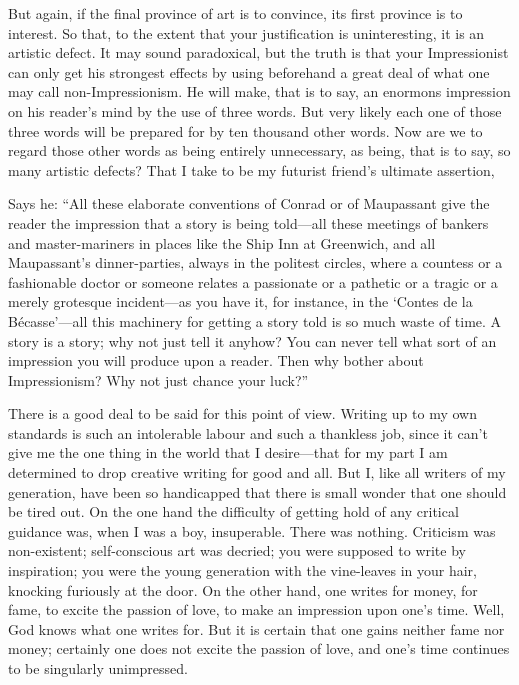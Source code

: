 But again, if the final province of art is to convince, its first
province is to interest. So that, to the extent that your justification
is uninteresting, it is an artistic defect. It may sound paradoxical,
but the truth is that your Impressionist can only get his strongest
effects by using beforehand a great deal of what one may call
non-Impressionism. He will make, that is to say, an enormons impression
on his reader's mind by the use of three words. But very likely each one
of those three words will be prepared for by ten thousand other words.
Now are we to regard those other words as being entirely unnecessary, as
being, that is to say, so many artistic defects? That I take to be my
futurist friend's ultimate assertion,

Says he: ``All these elaborate conventions of Conrad or of Maupassant
give the reader the impression that a story is being told---all these
meetings of bankers and master-mariners in places like the Ship Inn at
Greenwich, and all Maupassant's dinner-parties, always in the politest
circles, where a countess or a fashionable doctor or someone relates a
passionate or a pathetic or a tragic or a merely grotesque incident---as
you have it, for instance, in the `Contes de la Bécasse'---all this
machinery for getting a story told is so much waste of time. A story is
a story; why not just tell it anyhow? You can never tell what sort of an
impression you will produce upon a reader. Then why bother about
Impressionism? Why not just chance your luck?''

There is a good deal to be said for this point of view. Writing up to my
own standards is such an intolerable labour and such a thankless job,
since it can't give me the one thing in the world that I desire---that
for my part I am determined to drop creative writing for good and all.
But I, like all writers of my generation, have been so handicapped that
there is small wonder that one should be tired out. On the one hand the
difficulty of getting hold of any critical guidance was, when I was a
boy, insuperable. There was nothing. Criticism was non-existent;
self-conscious art was decried; you were supposed to write by
inspiration; you were the young generation with the vine-leaves in your
hair, knocking furiously at the door. On the other hand, one writes for
money, for fame, to excite the passion of love, to make an impression
upon one's time. Well, God knows what one writes for. But it is certain
that one gains neither fame nor money; certainly one does not excite the
passion of love, and one's time continues to be singularly unimpressed.

